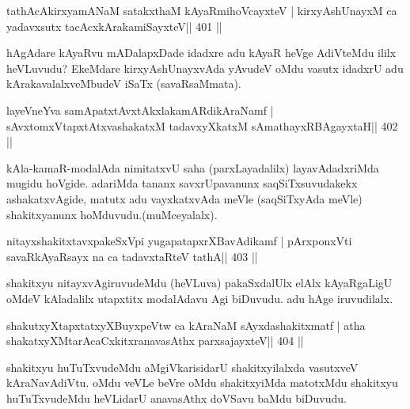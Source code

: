 
\begin{shl}
tathAcAkirxyamANaM satakxthaM kAyaRmihoVcayxteV |
kirxyAshUnayxM ca yadavxsutx tacAcxkArakamiSayxteV\hfill || 401 ||
\end{shl}

\begin{artha}
hAgAdare kAyaRvu mADalapxDade idadxre adu kAyaR heVge AdiVteMdu ililx heVLuvudu? EkeMdare kirxyAshUnayxvAda yAvudeV oMdu vasutx idadxrU adu kArakavalalxveMbudeV iSaTx (savaRsaMmata).
\end{artha}


\begin{shl}
layeVneYva samApatxtAvxtAkxlakamARdikAraNamf |
sAvxtomxVtapxtAtxvashakatxM tadavxyXkatxM sAmathayxRBAgayxtaH\hfill || 402 ||
\end{shl}

\begin{artha}
kAla-kamaR-modalAda nimitatxvU saha (parxLayadalilx) layavAdadxriMda  mugidu hoVgide. adariMda tananx savxrUpavanunx saqSiTxsuvudakekx ashakatxvAgide, matutx adu vayxkatxvAda meVle (saqSiTxyAda meVle) shakitxyanunx hoMduvudu.\break (muMceyalalx).
\end{artha}

\begin{shl}
nitayxshakitxtavxpakeSxV\s pi yugapatapxrXBavAdikamf |
pArxponxVti savaRkAyaRsayx na ca tadavxtaRteV tathA\hfill || 403 ||
\end{shl}

\begin{artha}
shakitxyu nitayxvAgiruvudeMdu (heVLuva) pakaSxdalUlx elAlx kAyaRgaLigU  oMdeV kAladalilx utapxtitx modalAdavu Agi biDuvudu. adu hAge iruvudilalx.
\end{artha}

\begin{shl}
shakutxyXtapxtatxyXBuyxpeVtw ca kAraNaM sAyxdashakitxmatf |
atha shakatxyXMtarAcaCxkitxranavasAthx parxsajayxteV\hfill || 404 ||
\end{shl}

\begin{artha}
shakitxyu huTuTxvudeMdu aMgiVkarisidarU shakitxyilalxda vasutxveV 
kAraNavAdiVtu. oMdu veVLe beVre oMdu shakitxyiMda matotxMdu shakitxyu 
huTuTxvudeMdu heVLidarU anavasAthx doVSavu baMdu biDuvudu.
\end{artha}

